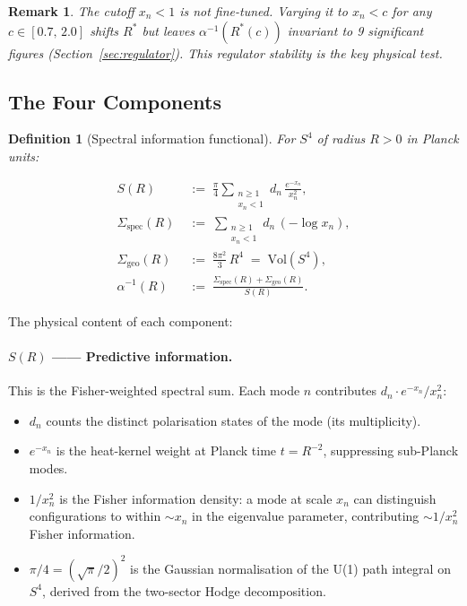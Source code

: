 \documentclass[12pt,a4paper]{article}
\newcommand{\ai}{\alpha^{-1}}
\newcommand{\Sg}{\Sigma_{\mathrm{geo}}}
\newcommand{\Ss}{\Sigma_{\mathrm{spec}}}
\newtheorem{definition}{Definition}[section]
\newtheorem{remark}{Remark}[section]
\begin{document}
\begin{remark}
The cutoff $x_n < 1$ is not fine-tuned.
Varying it to $x_n < c$ for any $c \in [0.7,\,2.0]$
shifts $R^*$ but leaves $\ai(R^*(c))$
invariant to 9 significant figures
(Section~\ref{sec:regulator}).
This regulator stability is the key physical test.
\end{remark}

\subsection{The Four Components}
\label{sec:fourcomp}

\begin{definition}[Spectral information functional]
\label{def:functional}
For $S^4$ of radius $R > 0$ in Planck units:

\begin{align}
  S(R)
  &\;:=\; \frac{\pi}{4}
    \sum_{\substack{n \geq 1 \\ x_n < 1}}
    d_n\,\frac{e^{-x_n}}{x_n^2},
  \label{eq:S}\\[6pt]
  \Ss(R)
  &\;:=\;
    \sum_{\substack{n \geq 1 \\ x_n < 1}}
    d_n\,(-\log x_n),
  \label{eq:Sigspec}\\[6pt]
  \Sg(R)
  &\;:=\;
    \frac{8\pi^2}{3}\,R^4
    \;=\; \mathrm{Vol}(S^4),
  \label{eq:Siggeo}\\[6pt]
  \ai(R)
  &\;:=\;
    \frac{\Ss(R) + \Sg(R)}{S(R)}.
  \label{eq:alpha}
\end{align}
\end{definition}

The physical content of each component:

\paragraph{$S(R)$ ------ Predictive information.}
This is the Fisher-weighted spectral sum.
Each mode $n$ contributes $d_n \cdot e^{-x_n}/x_n^2$:
\begin{itemize}
  \item $d_n$ counts the distinct polarisation states
    of the mode (its multiplicity).
  \item $e^{-x_n}$ is the heat-kernel weight at
    Planck time $t = R^{-2}$, suppressing sub-Planck modes.
  \item $1/x_n^2$ is the Fisher information density:
    a mode at scale $x_n$ can distinguish configurations
    to within $\sim x_n$ in the eigenvalue parameter,
    contributing $\sim 1/x_n^2$ Fisher information.
  \item $\pi/4 = (\sqrt{\pi}/2)^2$ is the Gaussian
    normalisation of the U(1) path integral on $S^4$,
    derived from the two-sector Hodge decomposition.
\end{itemize}
\end{document}
